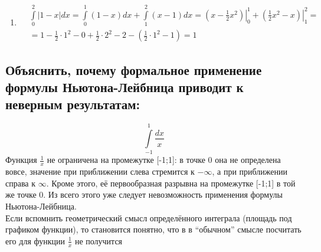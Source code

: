 \documentclass[a4paper, 12pt]{article}
\begin{document}
\begin{enumerate}
    \item %
    \begin{align*}
     &\int\limits_0^2 |1-x|dx = 
     \int\limits_0^1 (1-x)dx + \int\limits_1^2 (x-1)dx = 
     \left.\left( x-\frac{1}{2}x^2 \right)\right|_0^1 +
     \left.\left( \frac{1}{2}x^2 - x \right)\right|_1^2 = \\
     &= 1 - \frac{1}{2}\cdot 1^2 - 0 + \frac{1}{2}\cdot 2^2 -2 -
     \left(\frac{1}{2}\cdot 1^2 - 1\right) = 1
    \end{align*}
\end{enumerate}

\subsection{Объяснить, почему формальное применение формулы Ньютона-Лейбница приводит к неверным результатам: }
$$\int\limits_{-1}^1 \frac{dx}{x}$$
Функция $\frac{1}{x}$ не ограничена на промежутке [-1;1]: в точке 0 она не определена вовсе, значение при приближении слева стремится к $-\infty$, а при приближении справа к $\infty$. Кроме этого, её первообразная разрывна на промежутке [-1;1] в той же точке 0. Из всего этого уже следует невозможность применения формулы Ньютона-Лейбница. \\
Если вспомнить геометрический смысл определённого интеграла (площадь под графиком функции), то становится понятно, что в в ``обычном'' смысле посчитать его для функции $\frac{1}{x}$ не получится
\end{document}
